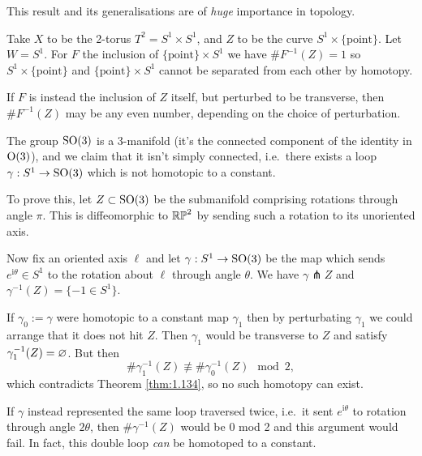\documentclass[a4paper,11pt]{article}
\begin{document}
	\begin{rmk}
		This result and its generalisations are of \emph{huge} importance in topology.
	\end{rmk}

	\begin{ex}
		Take $X$ to be the 2-torus $T^2 = S^1 \times S^1$, and $Z$ to be the curve $S^1 \times \{\text{point}\}$. Let $W = S^1$. For $F$ the inclusion of $\{\text{point}\}\times S^1$ we have $\#F^{-1}(Z) = 1$ so $S^1 \times \{\text{point}\}$ and $\{\text{point}\}\times S^1$ cannot be separated from each other by homotopy.
		

		If $F$ is instead the inclusion of $Z$ itself, but perturbed to be transverse, then $\#F^{-1}(Z)$ may be any even number, depending on the choice of perturbation.

	\end{ex}

	\begin{ex}
		The group $\operatorname{SO}(3)$ is a 3-manifold (it's the connected component of the identity in $\operatorname{O}(3)$), and we claim that it isn't simply connected, i.e.\ there exists a loop $\gamma : S^1 \to \operatorname{SO}(3)$ which is not homotopic to a constant.

		To prove this, let $Z \subset \operatorname{SO}(3)$ be the submanifold comprising rotations through angle $\pi$. This is diffeomorphic to $\mathbb{RP}^{2}$ by sending such a rotation to its unoriented axis.

		Now fix an oriented axis $\ell$ and let $\gamma : S^1 \to \operatorname{SO}(3)$ be the map which sends $e ^{\mathrm{i} \theta}\in S^1$ to the rotation about $\ell$ through angle $\theta$. We have $\gamma \pitchfork Z$ and $\gamma^{-1}(Z) = \{-1 \in S^1\}$.
		
		If $\gamma_0 := \gamma$ were homotopic to a constant map $\gamma_1$ then by perturbating $\gamma_1$ we could arrange that it does not hit $Z$. Then $\gamma_1$ would be transverse to $Z$ and satisfy $\gamma_1^{-1}(Z) = \varnothing$. But then
		\[
			\# \gamma_1^{-1}(Z) \not\equiv \# \gamma_0^{-1}(Z) \mod 2,
		\]
		which contradicts Theorem \ref{thm:1.134}, so no such homotopy can exist.

		If $\gamma$ instead represented the same loop traversed twice, i.e.\ it sent $e ^{\mathrm{i} \theta}$ to rotation through angle $2 \theta$, then $\# \gamma^{-1}(Z)$ would be 0 mod 2 and this argument would fail. In fact, this double loop \emph{can} be homotoped to a constant.  
	\end{ex}
\end{document}
